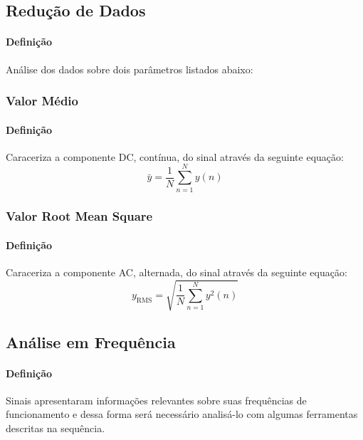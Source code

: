 \documentclass{article}
\begin{document}
        \subsection{Redução de Dados}
            \paragraph{Definição}Análise dos dados sobre dois parâmetros listados abaixo:

            \subsubsection{Valor Médio}
                \paragraph{Definição}Caraceriza a componente DC, contínua, do sinal através da seguinte equação:
                    \begin{equation}
                        \boxed{\bar{y} = \frac{1}{N} \sum_{n=1}^{N} y(n)}
                    \end{equation}

            \subsubsection{Valor Root Mean Square}
                \paragraph{Definição}Caraceriza a componente AC, alternada, do sinal através da seguinte equação:
                    \begin{equation}
                        \boxed{
                            y_{\text{RMS}} = \sqrt{\frac{1}{N} \sum_{n=1}^{N} y^{2}(n)}
                        }
                    \end{equation}

        \subsection{Análise em Frequência}
            \paragraph{Definição}Sinais apresentaram informações relevantes sobre suas frequências de funcionamento e dessa forma será necessário analisá-lo com algumas ferramentas descritas na sequência.
\end{document}
